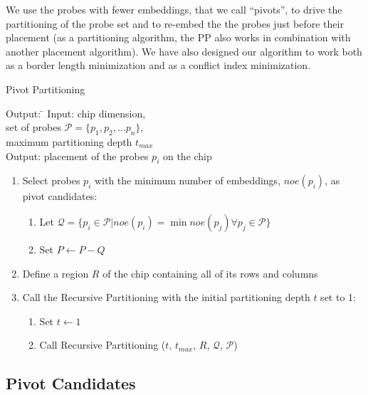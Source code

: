 \documentclass[runningheads]{llncs}
\begin{document}
We use the probes with fewer embeddings, that we call ``pivots'', to drive the
partitioning of the probe set and to re-embed the the probes just before their
placement (as a partitioning algorithm, the PP also works in combination with
another placement algorithm).
We have also designed our algorithm to work both as a border length minimization
and as a conflict index minimization.

\begin{algorithm}
\caption{Pivot Partitioning}
\label{alg:pivotpart}
\begin{minipage}{4.8in}

\begin{tabbing}
Output: \=									\kill
Input:  \> chip dimension,							\\
        \> set of probes $\mathcal{P} = \{p_{1}, p_{2}, ... p_{n}\}$, 		\\
        \> maximum partitioning depth $t_{max}$					\\
Output: \> placement of the probes $p_i$ on the chip
\end{tabbing}

\begin{enumerate}
\item Select probes $p_i$ with the minimum number of embeddings, $noe(p_i)$,
as pivot candidates:
  \begin{enumerate}
  \item Let $\mathcal{Q} = \{p_i \in \mathcal{P} | noe(p_i) = \min noe(p_j) \forall p_j \in \mathcal{P} \}$
  \item Set $P \leftarrow P - Q$
  \end{enumerate}
\item Define a region $R$ of the chip containing all of its rows and columns
\item Call the Recursive Partitioning with the initial partitioning depth $t$ set to 1:
  \begin{enumerate}
  \item Set $t \leftarrow 1$
  \item Call Recursive Partitioning ($t$, $t_{max}$, $R$, $\mathcal{Q}$, $\mathcal{P}$)
  \end{enumerate}
\end{enumerate}

\end{minipage}
\end{algorithm}

\subsection{Pivot Candidates}
\end{document}
